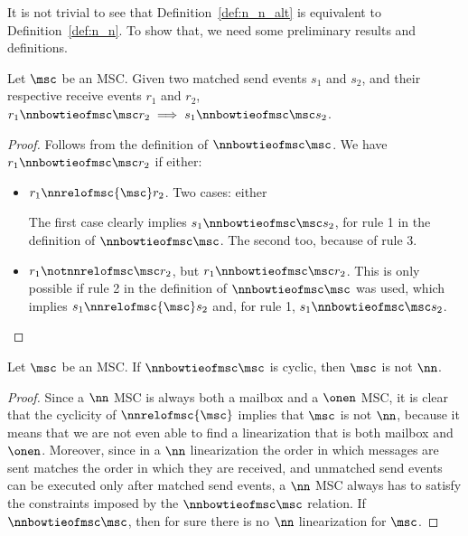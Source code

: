It is not trivial to see that Definition~\ref{def:n_n_alt} is equivalent to Definition~\ref{def:n_n}. To show that, we need some preliminary results and definitions.

\begin{proposition}
	Let $\msc$ be an MSC. Given two matched send events $s_1$ and $s_2$, and their respective receive events $r_1$ and $r_2$, $r_1 \nnbowtieofmsc\msc r_2 \implies s_1 \nnbowtieofmsc\msc s_2$.
\end{proposition}
\begin{proof}
Follows from the definition of $\nnbowtieofmsc\msc$. We have $r_1 \nnbowtieofmsc\msc r_2$ if either:
\begin{itemize}\itemsep=0.5ex
	\item $r_1 \nnrelofmsc{\msc} r_2$. Two cases: either \begin{enumerate*}[label={(\roman*)}]
		\item $s_1 \nnrelofmsc{\msc} s_2$, or
		\item $s_1 \notnnrelofmsc\msc s_2$.
	\end{enumerate*}
	The first case clearly implies $s_1 \nnbowtieofmsc\msc s_2$, for rule 1 in the definition of $\nnbowtieofmsc\msc$. The second too, because of rule 3.
	\item  $r_1 \notnnrelofmsc\msc r_2$, but $r_1 \nnbowtieofmsc\msc r_2$. This is only possible if rule 2 in the definition of $\nnbowtieofmsc\msc$ was used, which implies $s_1 \nnrelofmsc{\msc} s_2$ and, for rule 1, $s_1 \nnbowtieofmsc\msc s_2$.
\end{itemize}
\end{proof}

\begin{proposition}%
	Let $\msc$ be an MSC. If $\nnbowtieofmsc\msc$ is cyclic, then $\msc$ is not $\nn$.
\end{proposition}
\begin{proof}
Since a $\nn$ MSC is always both a mailbox and a $\onen$ MSC, it is clear that the cyclicity of $\nnrelofmsc{\msc}$ implies that $\msc$ is not $\nn$, because it means that we are not even able to find a linearization that is both mailbox and $\onen$. Moreover, since in a $\nn$ linearization the order in which messages are sent matches the order in which they are received, and unmatched send events can be executed only after matched send events, a $\nn$ MSC always has to satisfy the constraints imposed by the $\nnbowtieofmsc\msc$ relation. If $\nnbowtieofmsc\msc$, then for sure there is no $\nn$ linearization for $\msc$.
\end{proof}

